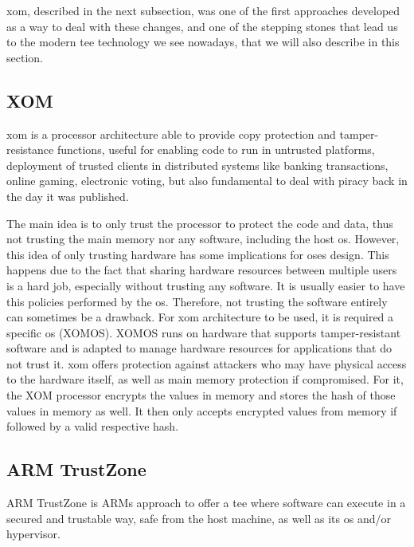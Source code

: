 \gls{xom}, described in the next subsection, was one of the first approaches developed as a way to deal with these changes, and one of the stepping stones that lead us to the modern \gls{tee} technology we see nowadays, that we will also describe in this section.

\subsection{XOM}
\label{ssec:xom}

\gls{xom} \cite{xomPaper} is a processor architecture able to provide copy protection and tamper-resistance functions, 
useful for enabling code to run in untrusted platforms, deployment of trusted clients in distributed systems like banking transactions, online gaming, electronic voting, but also fundamental to deal with piracy back in the day it was published. 

The main idea is to only trust the processor to protect the code and data, thus not trusting the main memory nor any software, including the host \gls{os}.
However, this idea of only trusting hardware has some implications for \gls{os}es design. This happens due to the fact that sharing hardware resources between multiple users is a hard job, especially without trusting any software. It is usually easier to have this policies performed by the \gls{os}. Therefore, not trusting the software entirely can sometimes be a drawback.  
For \gls{xom} architecture to be used, it is required a specific \gls{os} (XOMOS). XOMOS runs on hardware that supports tamper-resistant software and is adapted to manage hardware resources for applications that do not trust it.
\gls{xom} offers protection against attackers who may have physical access to the hardware itself, as well as main memory protection if compromised. For it, the XOM processor encrypts the values in memory and stores the hash of those values in memory as well. It then only accepts encrypted values from memory if followed by a valid respective hash. 



\subsection{ARM TrustZone}
\label{ssec:armtz}

ARM TrustZone \cite{armTZPaper} is ARMs approach to offer a \gls{tee} where software can execute in a secured and trustable way, safe from the host machine, as well as its \gls{os} and/or hypervisor. 

